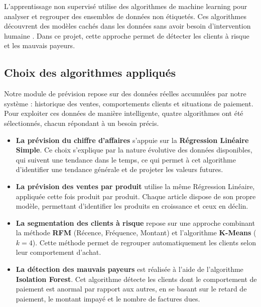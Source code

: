L'apprentissage non supervisé utilise des algorithmes de machine learning pour analyser
et regrouper des ensembles de données non étiquetés. Ces algorithmes découvrent des
modèles cachés dans les données sans avoir besoin d'intervention humaine
\cite{ibm_supervised}.
Dans ce projet, cette approche permet de détecter les clients à risque et les mauvais
payeurs.

\subsection{Choix des algorithmes appliqués}

Notre module de prévision repose sur des données réelles accumulées par notre système :
historique des ventes, comportements clients et situations de paiement.
Pour exploiter ces données de manière intelligente, quatre algorithmes ont été
sélectionnés, chacun répondant à un besoin précis.

\begin{itemize}

  \item \textbf{La prévision du chiffre d'affaires}
  s'appuie sur la \textbf{Régression Linéaire Simple}. Ce choix s'explique par la
  nature évolutive des données disponibles, qui suivent une tendance dans le temps,
  ce qui permet à cet algorithme d'identifier une tendance générale et de projeter
  les valeurs futures.

  \item \textbf{La prévision des ventes par produit}
  utilise la même Régression Linéaire, appliquée cette fois produit par produit.
  Chaque article dispose de son propre modèle, permettant d'identifier les produits
  en croissance et ceux en déclin.

  \item \textbf{La segmentation des clients à risque}
  repose sur une approche combinant la méthode \textbf{RFM} (Récence, Fréquence,
  Montant) et l'algorithme \textbf{K-Means} ($k=4$). Cette méthode permet de
  regrouper automatiquement les clients selon leur comportement d'achat.

  \item \textbf{La détection des mauvais payeurs}
  est réalisée à l'aide de l'algorithme \textbf{Isolation Forest}. Cet algorithme
  détecte les clients dont le comportement de paiement est anormal par rapport aux
  autres, en se basant sur le retard de paiement, le montant impayé et le nombre
  de factures dues.

\end{itemize}

